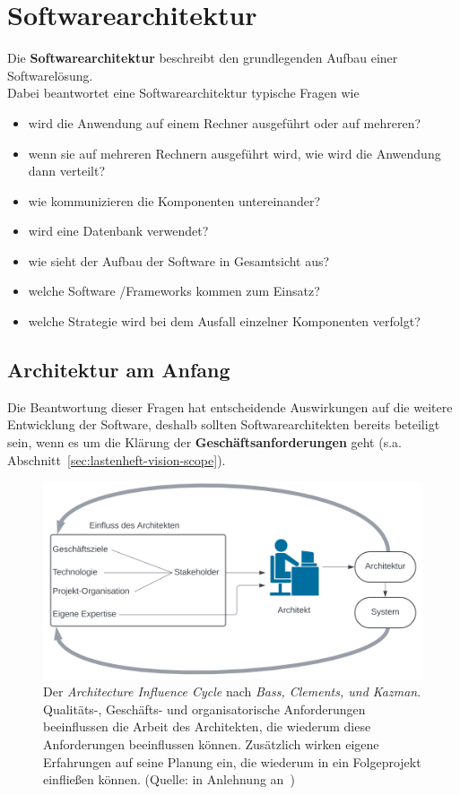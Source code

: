 \section{Softwarearchitektur}\label{sec:softwarearchitektur}

Die \textbf{Softwarearchitektur} beschreibt den grundlegenden Aufbau einer Softwarelösung.\\

\noindent
Dabei beantwortet eine Softwarearchitektur typische Fragen wie

\begin{itemize}
    \item wird die Anwendung auf einem Rechner ausgeführt oder auf mehreren?
    \item wenn sie auf mehreren Rechnern ausgeführt wird, wie wird die Anwendung dann verteilt?
    \item wie kommunizieren die Komponenten untereinander?
    \item wird eine Datenbank verwendet?
    \item wie sieht der Aufbau der Software in Gesamtsicht aus?
    \item welche Software /Frameworks kommen zum Einsatz?
    \item welche Strategie wird bei dem Ausfall einzelner Komponenten verfolgt?
\end{itemize}

\subsection*{Architektur am Anfang}
Die Beantwortung dieser Fragen hat entscheidende Auswirkungen auf die weitere Entwicklung der Software, deshalb sollten Softwarearchitekten bereits beteiligt sein, wenn es um die Klärung der \textbf{Geschäftsanforderungen} geht (s.a. Abschnitt~\ref{sec:lastenheft-vision-scope}).\\

\begin{figure}
    \centering
    \includegraphics[scale=0.4]{part two/Architektur/img/aic}
    \caption{Der \textit{Architecture Influence Cycle} nach \textit{Bass, Clements, und Kazman}. Qualitäts-, Geschäfts- und organisatorische Anforderungen beeinflussen die Arbeit des Architekten, die wiederum diese Anforderungen beeinflussen können. Zusätzlich wirken eigene Erfahrungen auf seine Planung ein, die wiederum in ein Folgeprojekt einfließen können. (Quelle: in Anlehnung an~\cite[58, Figure 3.5]{BCK12})}
    \label{fig:aic}
\end{figure}


